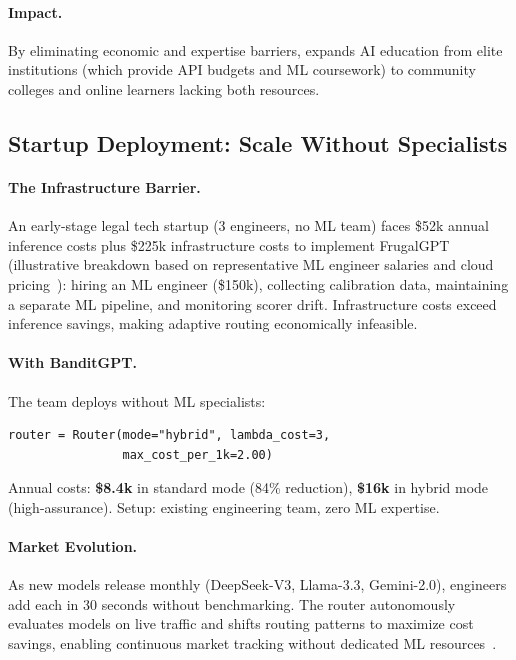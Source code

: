 \paragraph{Impact.} By eliminating economic and expertise barriers, \ours{} expands AI education from elite institutions (which provide API budgets and ML coursework) to community colleges and online learners lacking both resources.

\subsection{Startup Deployment: Scale Without Specialists}

\paragraph{The Infrastructure Barrier.} An early-stage legal tech startup (3 engineers, no ML team) faces \$52k annual inference costs plus \$225k infrastructure costs to implement FrugalGPT (illustrative breakdown based on representative ML engineer salaries and cloud pricing~\cite{builtin2025salary,openai2025pricing}): hiring an ML engineer (\$150k), collecting calibration data, maintaining a separate ML pipeline, and monitoring scorer drift. Infrastructure costs exceed inference savings, making adaptive routing economically infeasible.

\paragraph{With BanditGPT.} The team deploys without ML specialists:

\begin{small}
\begin{verbatim}
router = Router(mode="hybrid", lambda_cost=3,
                max_cost_per_1k=2.00)
\end{verbatim}
\end{small}

\noindent Annual costs: \textbf{\$8.4k} in standard mode (84\% reduction), \textbf{\$16k} in hybrid mode (high-assurance). Setup: existing engineering team, zero ML expertise.

\paragraph{Market Evolution.} As new models release monthly (DeepSeek-V3, Llama-3.3, Gemini-2.0), engineers add each in 30 seconds without benchmarking. The router autonomously evaluates models on live traffic and shifts routing patterns to maximize cost savings, enabling continuous market tracking without dedicated ML resources~\cite{openrouter2025models,artificialanalysis2025}.

